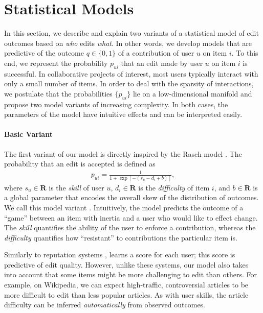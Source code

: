 \section{Statistical Models}
\label{sec:models}

In this section, we describe and explain two variants of a statistical model of edit outcomes based on \emph{who} edits \emph{what}.
In other words, we develop models that are predictive of the outcome $q \in \{0, 1\}$ of a contribution of user $u$ on item $i$.
To this end, we represent the probability $p_{ui}$ that an edit made by user $u$ on item $i$ is successful.
In collaborative projects of interest, most users typically interact with only a small number of items.
In order to deal with the sparsity of interactions, we postulate that the probabilities $\{ p_{ui} \}$ lie on a low-dimensional manifold and propose two model variants of increasing complexity.
In both cases, the parameters of the model have intuitive effects and can be interpreted easily.

\paragraph{Basic Variant}
The first variant of our model is directly inspired by the Rasch model \citep{rasch1960probabilistic}.
The probability that an edit is accepted is defined as
\begin{align}
\label{eq:basicmodel}
p_{ui} = \frac{1}{1 + \exp[-(s_u - d_i + b)]},
\end{align}
where $s_u\in\mathbf{R}$ is the \emph{skill} of user $u$, $d_i\in\mathbf{R}$ is the \emph{difficulty} of item $i$, and $b \in \mathbf{R}$ is a global parameter that encodes the overall skew of the distribution of outcomes.
We call this model variant .
Intuitively, the model predicts the outcome of a ``game'' between an item with inertia and a user who would like to effect change.
The \emph{skill} quantifies the ability of the user to enforce a contribution, whereas the \emph{difficulty} quantifies how ``resistant'' to contributions the particular item is.

Similarly to reputation systems \citep{adler2007content},  learns a score for each user; this score is predictive of edit quality.
However, unlike these systems, our model also takes into account that some items might be more challenging to edit than others.
For example, on Wikipedia, we can expect high-traffic, controversial articles to be more difficult to edit than less popular articles.
As with user skills, the article difficulty can be inferred \emph{automatically} from observed outcomes.


